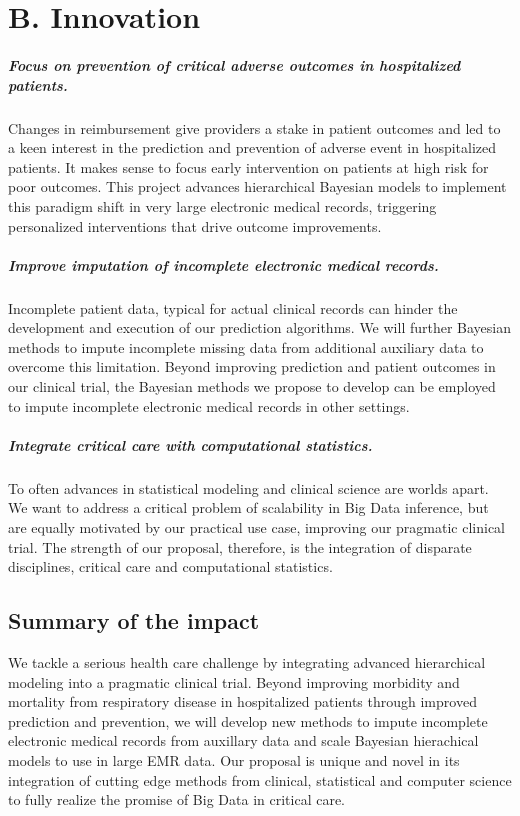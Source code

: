 \documentclass[11pt,notitlepage]{article}
\begin{document}
\section*{B. Innovation}
\subparagraph*{Focus on prevention of critical adverse outcomes in hospitalized patients.}
Changes in reimbursement give providers a stake in patient outcomes and led to a keen interest in the prediction and prevention of adverse event in hospitalized patients. It makes sense to focus early intervention on patients at high risk for poor outcomes. This project advances hierarchical Bayesian models to implement this paradigm shift in very large electronic medical records, triggering personalized interventions that drive outcome improvements.

\subparagraph*{Improve imputation of incomplete electronic medical records.}
Incomplete patient data, typical for actual clinical records can hinder the development and execution of our prediction algorithms. We will further Bayesian methods to impute incomplete missing data from additional auxiliary data to overcome this limitation. Beyond improving prediction and patient outcomes in our clinical trial, the Bayesian methods we propose to develop can be employed to impute incomplete electronic medical records in other settings.

\subparagraph*{Integrate critical care with computational statistics.}
To often advances in statistical modeling and clinical science are worlds apart. We want to address a critical problem of scalability in Big Data inference, but are equally motivated by our practical use case, improving our pragmatic clinical trial. The strength of our proposal, therefore, is the integration of disparate disciplines, critical care and computational statistics. 

\subsection*{Summary of the impact}
We tackle a serious health care challenge by integrating advanced hierarchical modeling into a pragmatic clinical trial. Beyond improving morbidity and mortality from respiratory disease in hospitalized patients through improved prediction and prevention, we will develop new methods to impute incomplete electronic medical records from auxillary data and scale Bayesian hierachical models to use in large EMR data. Our proposal is unique and novel in its integration of cutting edge methods from clinical, statistical and computer science to fully realize the promise of Big Data in critical care.
\end{document}
